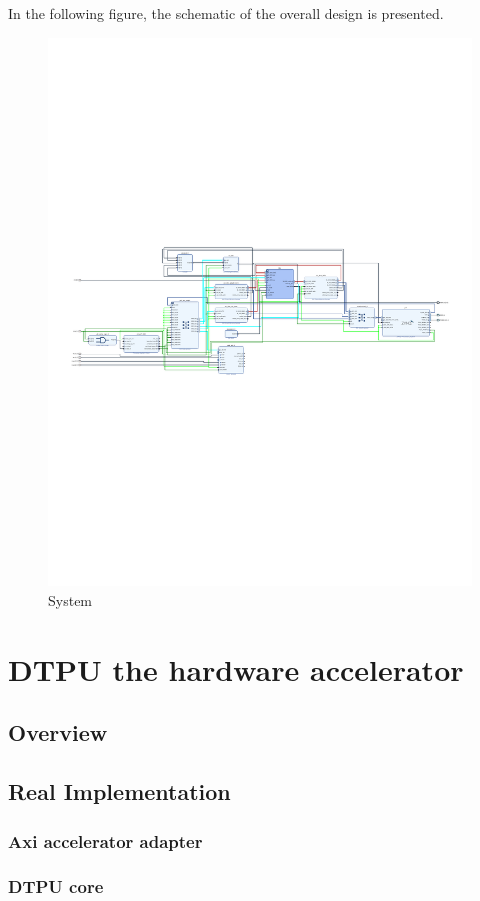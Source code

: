 \newpage
In the following figure, the schematic of the overall design is presented.
\begin{figure}[!htbp]
\centering
\captionsetup{justification=centering}
\includegraphics[scale=0.97,angle=90]{./figure/system_schematic.pdf}
\caption{System}
\label{fig:sys}
\end{figure}

\section{DTPU the hardware accelerator}

\subsection{Overview}

\subsection{Real Implementation}
\subsubsection{Axi accelerator adapter}
\subsubsection{DTPU core}
